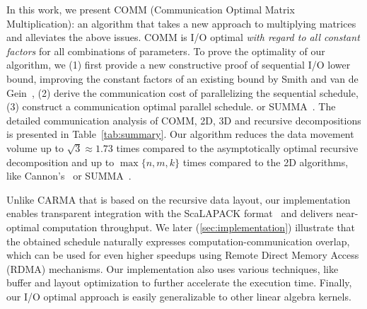 \documentclass[sigplan,review,anonymous]{acmart}\settopmatter{printfolios=true,printccs=false,printacmref=false}
\newcommand\greg[1]{\textcolor{blue}{[Greg: #1]}}
\newcommand\mac[1]{\textcolor{red}{[Mac: #1]}}
\begin{document}

In this work, we present COMM (Communication Optimal Matrix Multiplication): 
an algorithm that takes a new approach to multiplying
matrices and alleviates the above issues. COMM is I/O optimal \emph{with regard 
to all constant factors}
for all combinations of parameters.
%
To prove the optimality of our algorithm,  we (1) first provide a new 
constructive proof of sequential I/O lower bound, improving the constant 
factors of an existing bound 
by Smith and van de Gein~\cite{tightMMM}, (2) derive the communication cost of  
parallelizing the sequential
schedule, (3) construct a
communication optimal parallel schedule. 
or SUMMA~\cite{summa}. The detailed communication analysis of COMM, 2D, 3D and 
recursive decompositions is
presented in Table~\ref{tab:summary}. Our algorithm reduces the data 
movement volume up to $\sqrt{3} \approx 1.73$ times compared to the 
asymptotically optimal recursive decomposition and up to 
$\max\{n,m,k\}$ times compared to the 2D
algorithms, like Cannon's~\cite{generalCannon} or SUMMA~\cite{summa}.


Unlike CARMA that is based on the recursive data layout, our implementation
enables transparent integration with the ScaLAPACK
format~\cite{scalapackLayout} and delivers near-optimal computation throughput.
%
We later (\cref{sec:implementation}) illustrate that the obtained schedule 
naturally expresses
computation-communication overlap, 
%
%
 which can 
be used for even higher speedups
using Remote Direct Memory Access (RDMA) mechanisms.
%
Our implementation
also uses various techniques, like buffer and layout optimization to further
accelerate the execution time. Finally, our I/O optimal approach is
easily generalizable to other linear algebra kernels. 
\end{document}
